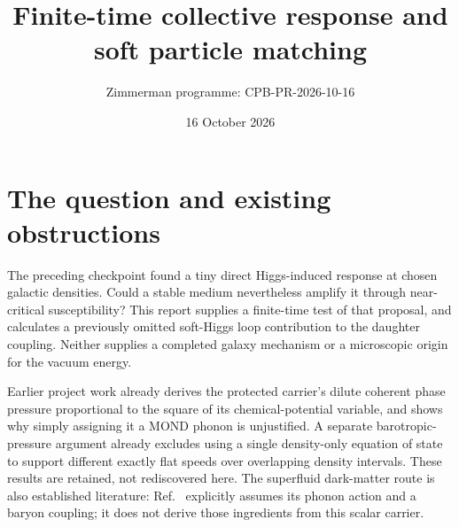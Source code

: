 \documentclass[11pt]{article}
\title{Finite-time collective response and soft particle matching}
\author{Zimmerman programme: CPB-PR-2026-10-16}
\date{16 October 2026}
\begin{document}
\maketitle
\section{The question and existing obstructions}
The preceding checkpoint found a tiny direct Higgs-induced response at
chosen galactic densities. Could a stable medium nevertheless amplify it
through near-critical susceptibility? This report supplies a finite-time
test of that proposal, and calculates a previously omitted soft-Higgs loop
contribution to the daughter coupling. Neither supplies a completed galaxy
mechanism or a microscopic origin for the vacuum energy.

Earlier project work already derives the protected carrier's dilute coherent
phase pressure proportional to the square of its chemical-potential variable,
and shows why simply assigning it a MOND phonon is unjustified. A separate
barotropic-pressure argument already excludes using a single density-only
equation of state to support different exactly flat speeds over overlapping
density intervals. These results are retained, not rediscovered here.
The superfluid dark-matter route is also established literature:
Ref.~\cite{pr:superfluid} explicitly assumes its phonon action and a baryon
coupling; it does not derive those ingredients from this scalar carrier.
\end{document}
